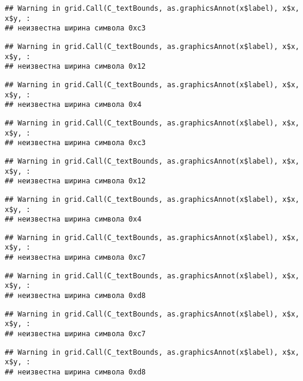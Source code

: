 \documentclass[
]{article}
\begin{document}
\begin{verbatim}
## Warning in grid.Call(C_textBounds, as.graphicsAnnot(x$label), x$x, x$y, :
## неизвестна ширина символа 0xc3
\end{verbatim}

\begin{verbatim}
## Warning in grid.Call(C_textBounds, as.graphicsAnnot(x$label), x$x, x$y, :
## неизвестна ширина символа 0x12
\end{verbatim}

\begin{verbatim}
## Warning in grid.Call(C_textBounds, as.graphicsAnnot(x$label), x$x, x$y, :
## неизвестна ширина символа 0x4
\end{verbatim}

\begin{verbatim}
## Warning in grid.Call(C_textBounds, as.graphicsAnnot(x$label), x$x, x$y, :
## неизвестна ширина символа 0xc3
\end{verbatim}

\begin{verbatim}
## Warning in grid.Call(C_textBounds, as.graphicsAnnot(x$label), x$x, x$y, :
## неизвестна ширина символа 0x12
\end{verbatim}

\begin{verbatim}
## Warning in grid.Call(C_textBounds, as.graphicsAnnot(x$label), x$x, x$y, :
## неизвестна ширина символа 0x4
\end{verbatim}

\begin{verbatim}
## Warning in grid.Call(C_textBounds, as.graphicsAnnot(x$label), x$x, x$y, :
## неизвестна ширина символа 0xc7
\end{verbatim}

\begin{verbatim}
## Warning in grid.Call(C_textBounds, as.graphicsAnnot(x$label), x$x, x$y, :
## неизвестна ширина символа 0xd8
\end{verbatim}

\begin{verbatim}
## Warning in grid.Call(C_textBounds, as.graphicsAnnot(x$label), x$x, x$y, :
## неизвестна ширина символа 0xc7
\end{verbatim}

\begin{verbatim}
## Warning in grid.Call(C_textBounds, as.graphicsAnnot(x$label), x$x, x$y, :
## неизвестна ширина символа 0xd8
\end{verbatim}
\end{document}
